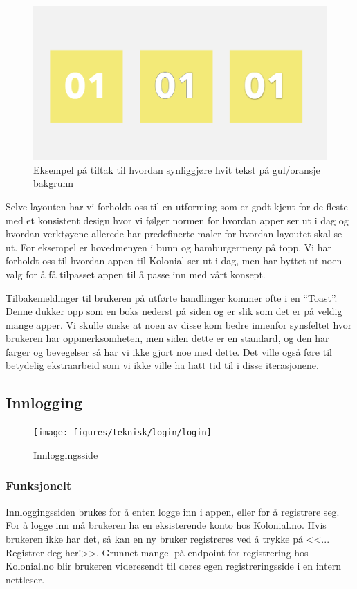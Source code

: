 \begin{figure}[H]
    \includegraphics[width=\textwidth]{figures/something}
    \caption[Fargekontrast]{Eksempel på tiltak til hvordan synliggjøre hvit tekst på gul/oransje bakgrunn
    \label{fig:color_contrast}}
\end{figure}

Selve layouten har vi forholdt oss til en utforming som er godt kjent for de fleste med et konsistent design hvor vi følger normen for hvordan apper ser ut i dag og hvordan verktøyene allerede har predefinerte maler for hvordan layoutet skal se ut. For eksempel er hovedmenyen i bunn og hamburgermeny på topp. Vi har forholdt oss til hvordan appen til Kolonial ser ut i dag, men har byttet ut noen valg for å få tilpasset appen til å passe inn med vårt konsept.

Tilbakemeldinger til brukeren på utførte handlinger kommer ofte i en “Toast”. Denne dukker opp som en boks nederst på siden og er slik som det er på veldig mange apper. Vi skulle ønske at noen av disse kom bedre innenfor synsfeltet hvor brukeren har oppmerksomheten, men siden dette er en standard, og den har farger og bevegelser så har vi ikke gjort noe med dette. Det ville også føre til betydelig ekstraarbeid som vi ikke ville ha hatt tid til i disse iterasjonene.

\subsection{\textbf{Innlogging}}
\begin{figure}[H]
    \texttt{[image: figures/teknisk/login/login]}
    \caption[Innlogging 1]{Innloggingsside
    \label{fig:login}}
\end{figure}

\subsubsection{\textbf{Funksjonelt}}
Innloggingssiden brukes for å enten logge inn i appen, eller for å registrere seg. For å logge inn må brukeren ha en eksisterende konto hos Kolonial.no. Hvis brukeren ikke har det, så kan en ny bruker registreres ved å trykke på <<... Registrer deg her!>>. Grunnet mangel på endpoint for registrering hos Kolonial.no blir brukeren videresendt til deres egen registreringsside i en intern nettleser. 

